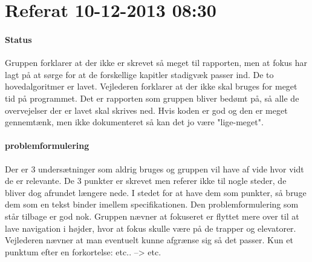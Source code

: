 \documentclass[article,11pt]{memoir}
\begin{document}
\section{Referat 10-12-2013 08:30}

\paragraph{Status}
Gruppen forklarer at der ikke er skrevet så meget til rapporten, men at fokus har lagt på at sørge for at de forskellige kapitler stadigvæk passer ind. 
De to hovedalgoritmer er lavet. Vejlederen forklarer at der ikke skal bruges for meget tid på programmet. Det er rapporten som gruppen bliver bedømt på, så alle de overvejelser der er lavet skal skrives ned. Hvis koden er god og den er meget gennemtænk, men ikke dokumenteret så kan det jo være "lige-meget".

\paragraph{problemformulering}
Der er 3 undersætninger som aldrig bruges og gruppen vil have af vide hvor vidt de er relevante. De 3 punkter er skrevet men referer ikke til nogle steder, de bliver dog afrundet længere nede. I stedet for at have dem som punkter, så bruge dem som en tekst binder imellem specifikationen. 
Den problemformulering som står tilbage er god nok. Gruppen nævner at fokuseret er flyttet mere over til at lave navigation i højder, hvor at fokus skulle være på de trapper og elevatorer. Vejlederen nævner at man eventuelt kunne afgrænse sig så det passer.
Kun et punktum efter en forkortelse: etc.. --> etc. 
\end{document}
